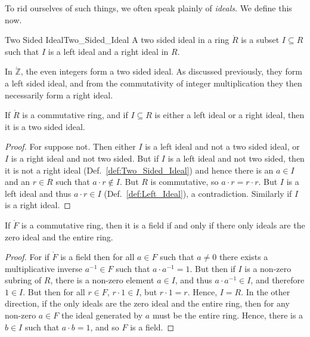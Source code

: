     To rid ourselves of such things, we often speak plainly of
    \textit{ideals}. We define this now.
    \begin{fdefinition}{Two Sided Ideal}{Two_Sided_Ideal}
        A two sided ideal in a ring $\ring{R}$ is a subset $I\subseteq{R}$
        such that $I$ is a left ideal and a right ideal in $R$.
    \end{fdefinition}
    \begin{example}
        In $\ring{\mathbb{Z}}$, the even integers form a two sided ideal.
        As discussed previously, they form a left sided ideal, and from
        the commutativity of integer multiplication they then necessarily
        form a right ideal.
    \end{example}
    \begin{theorem}
        \label{thm:One_Sided_Ideal_in_Comm_Ring_is_Two_Sided}%
        If $\ring{R}$ is a commutative ring, and if $I\subseteq{R}$ is
        either a left ideal or a right ideal, then it is a two sided ideal.
    \end{theorem}
    \begin{proof}
        For suppose not. Then either $I$ is a left ideal and not a two sided
        ideal, or $I$ is a right ideal and not two sided. But if $I$ is a
        left ideal and not two sided, then it is not a right ideal
        (Def.~\ref{def:Two_Sided_Ideal}) and hence there is an $a\in{I}$ and
        an $r\in{R}$ such that $a\cdot{r}\notin{I}$. But $R$ is commutative,
        so $a\cdot{r}=r\cdot{r}$. But $I$ is a left ideal and thus
        $a\cdot{r}\in{I}$ (Def.~\ref{def:Left_Ideal}), a contradiction.
        Similarly if $I$ is a right ideal.
    \end{proof}
    \begin{theorem}
        \label{thm:Ideals_of_Field}%
        If $\ring{F}$ is a commutative ring, then it is a field if and only
        if there only ideals are the zero ideal and the entire ring.
    \end{theorem}
    \begin{proof}
        For if $\ring{F}$ is a field then for all $a\in{F}$ such that
        $a\ne{0}$ there exists a multiplicative inverse
        $a^{\minus{1}}\in{F}$ such that $a\cdot{a}^{\minus{1}}=1$. But then
        if $I$ is a non-zero subring of $R$, there is a non-zero element
        $a\in{I}$, and thus $a\cdot{a}^{\minus{1}}\in{I}$, and
        therefore $1\in{I}$. But then for all $r\in{F}$, $r\cdot{1}\in{I}$,
        but $r\cdot{1}=r$. Hence, $I=R$. In the other direction, if
        the only ideals are the zero ideal and the entire ring, then for
        any non-zero $a\in{F}$ the ideal generated by $a$ must be the entire
        ring. Hence, there is a $b\in{I}$ such that $a\cdot{b}=1$, and so
        $F$ is a field.
    \end{proof}
